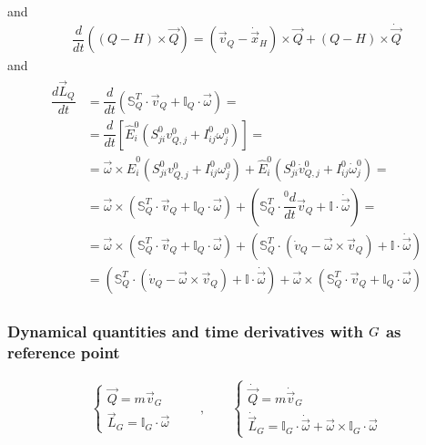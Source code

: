 \documentclass[letterpaper,10pt,english]{jupyterBook}
\begin{document}
\sphinxAtStartPar
and
\begin{equation*}
\begin{split}\dfrac{d}{dt} \left( (Q-H) \times \vec{Q} \right) = ( \vec{v}_Q - \dot{\vec{x}}_H ) \times \vec{Q} + ( Q - H ) \times \dot{\vec{Q}}\end{split}
\end{equation*}
\sphinxAtStartPar
and
\begin{equation*}
\begin{split}\begin{aligned}
 \dfrac{d \vec{L}_Q}{dt} 
 & = \dfrac{d}{dt} \left( \mathbb{S}^T_Q \cdot \vec{v}_Q + \mathbb{I}_Q \cdot \vec{\omega} \right) = \\
 & = \dfrac{d}{dt} \left[ \hat{E}_i^0 \left( S^0_{ji} v^0_{Q,j} + I^0_{ij} \omega^0_j \right) \right] = \\
 & = \vec{\omega} \times \hat{E}_i^0 \left( S^0_{ji} v^0_{Q,j} + I^0_{ij} \omega^0_j \right)
   + \hat{E}^0_i \left( S_{ji}^0 \dot{v}^0_{Q,j} + I^0_{ij} \dot{\omega}^0_j \right) = \\
 & = \vec{\omega} \times ( \mathbb{S}_Q^T \cdot \vec{v}_Q + \mathbb{I}_Q \cdot \vec{\omega} )
   + \left( \mathbb{S}_Q^T \cdot \dfrac{{}^0 d}{dt} \vec{v}_Q + \mathbb{I} \cdot \dot{\vec{\omega}} \right) = \\
 & = \vec{\omega} \times ( \mathbb{S}_Q^T \cdot \vec{v}_Q + \mathbb{I}_Q \cdot \vec{\omega} )
   + \left( \mathbb{S}_Q^T \cdot \left( \dot{v}_Q - \vec{\omega} \times \vec{v}_Q \right) + \mathbb{I} \cdot \dot{\vec{\omega}} \right) \\
 & = \left( \mathbb{S}_Q^T \cdot \left( \dot{v}_Q - \vec{\omega} \times \vec{v}_Q \right) + \mathbb{I} \cdot \dot{\vec{\omega}} \right) 
    + \vec{\omega} \times ( \mathbb{S}_Q^T \cdot \vec{v}_Q + \mathbb{I}_Q \cdot \vec{\omega} )
\end{aligned}\end{split}
\end{equation*}

\subsubsection{Dynamical quantities and time derivatives with \protect\(G\protect\) as reference point}
\label{\detokenize{ch/inertia:dynamical-quantities-and-time-derivatives-with-g-as-reference-point}}\begin{equation*}
\begin{split}
\begin{cases}
  \vec{Q} = m \vec{v}_G \\
  \vec{L}_G = \mathbb{I}_G \cdot \vec{\omega}
\end{cases}
\qquad , \qquad
\begin{cases}
  \dot{\vec{Q}} = m \dot{\vec{v}}_G \\
  \dot{\vec{L}}_G = \mathbb{I}_G \cdot \dot{\vec{\omega}} + \vec{\omega} \times \mathbb{I}_G \cdot \vec{\omega}
\end{cases}\end{split}
\end{equation*}
\sphinxstepscope
\end{document}
